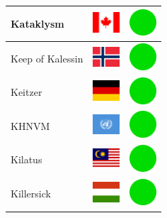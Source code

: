 \documentclass[12pt, a4paper, twoside]{report}
\begin{document}
\begin{center}
\begin{longtable}{|p{5cm}|p{2cm}|p{2cm}|}
 Kataklysm                                                  & \includegraphics[width=1cm]{../img/flags/ca} &   \includegraphics[width=1cm]{../likes/y} \\ \hline
 Keep of Kalessin                                           & \includegraphics[width=1cm]{../img/flags/no} &   \includegraphics[width=1cm]{../likes/y} \\ \hline
 Keitzer                                                    & \includegraphics[width=1cm]{../img/flags/de} &   \includegraphics[width=1cm]{../likes/y} \\ \hline
 KHNVM                                                      & \includegraphics[width=1cm]{../img/flags/un} &   \includegraphics[width=1cm]{../likes/y} \\ \hline
 Kilatus                                                    & \includegraphics[width=1cm]{../img/flags/my} &   \includegraphics[width=1cm]{../likes/y} \\ \hline
 Killersick                                                 & \includegraphics[width=1cm]{../img/flags/hu} &   \includegraphics[width=1cm]{../likes/y} \\ \hline

\end{longtable}
\end{center}
\end{document}
